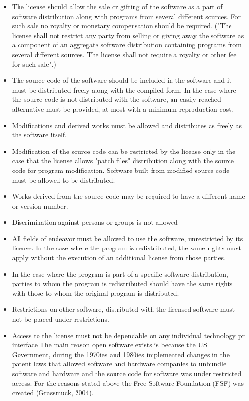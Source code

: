 \begin{itemize}

\item The license should allow the sale or gifting of the software as a part of software distribution along with programs from several different sources. For such sale no royalty or monetary compensation should be required. ("The license shall not restrict any party from selling or giving away the software as a component of an aggregate software distribution containing programs from several different sources. The license shall not require a royalty or other fee for such sale".)
\item The source code of the software should be included in the software and it must be distributed freely along with the compiled form. In the case where the source code is not distributed with the software, an easily reached alternative must be provided, at most with a minimum reproduction cost.
\item Modifications and derived works must be allowed and distributes as freely as the software itself.
\item Modification of the source code can be restricted by the license only in the case that the license allows "patch files" distribution along with the source code for program modification. Software built from modified source code must be allowed to be distributed. \item Works derived from the source code may be required to have a different name or version number.
\item Discrimination against persons or groups is not allowed
\item All fields of endeavor must be allowed to use the software, unrestricted by its license.
In the case where the program is redistributed, the same rights must apply without the execution of an additional license from those parties.
\item In the case where the program is part of a specific software distribution, parties to whom the program is redistributed should have the same rights with those to  whom the original program is distributed.
\item Restrictions on other software, distributed with the licensed software must not be placed under restrictions.
\item Access to the license must not be dependable on any individual technology pr interface
The main reason open software exists is because the US Government, during the 1970ies and 1980ies implemented changes in the patent laws that allowed software and hardware companies to unbundle software and hardware and the source code for software was under restricted access. For the reasons stated above the Free Software Foundation (FSF) was created (Grassmuck, 2004).
\end{itemize}

